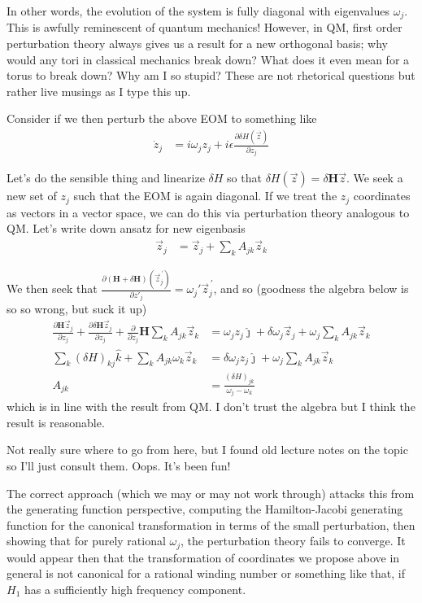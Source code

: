 \documentclass[12pt]{report}
\newcommand{\pd}[2]{\frac{\partial#1}{\partial#2}}
\newcommand{\pvec}[1]{\vec{#1}^{\,\prime}}
\begin{document}
In other words, the evolution of the system is fully diagonal with eigenvalues
$\omega_j$. This is awfully reminescent of quantum mechanics! However, in QM,
first order perturbation theory always gives us a result for a new orthogonal
basis; why would any tori in classical mechanics break down? What does it even
mean for a torus to break down? Why am I so stupid? These are not rhetorical
questions but rather live musings as I type this up.

Consider if we then perturb the above EOM to something like
\begin{align}
    \dot{z}_j &= i\omega_jz_j + i\epsilon \pd{\delta
    H\left(\vec{z}\right)}{z_j}
\end{align}

Let's do the sensible thing and linearize $\delta H$ so that
$\delta H(\vec{z}) = \delta \mathbf{H}\vec{z}$. We seek a new set of $z_j$
such that the EOM is again diagonal. If we treat the $z_j$ coordinates as
vectors in a vector space, we can do this via perturbation theory
analogous to QM\@. Let's write down ansatz for new eigenbasis
\begin{align}
    \vec{z}_j &= \vec{z}_j + \sum_kA_{jk}\vec{z}_k
\end{align}

We then seek that $\pd{(\mathbf{H} + \delta \mathbf{H})(\pvec{z}_j)}{z'_j} =
\omega_j' \pvec{z}_j$, and so (goodness the algebra below is so so wrong, but
suck it up)
\begin{align}
    \pd{\mathbf{H}\vec{z}_j}{z_j} + \pd{\delta \mathbf{H}\vec{z}_j}{z_j} +
        \pd{}{z_j}\mathbf{H}\sum_k A_{jk}\vec{z}_k
        &= \omega_j z_j\hat{\jmath} + \delta
        \omega_j \vec{z}_j + \omega_j \sum_k A_{jk}\vec{z}_k\\
    \sum_k (\delta H)_{kj}\hat{k} + \sum_kA_{jk}\omega_k \vec{z}_k &=
        \delta \omega_j z_j\hat{\jmath} + \omega_j \sum_k A_{jk}\vec{z}_k\\
    A_{jk} &= \frac{(\delta H)_{jk}}{\omega_j - \omega_k}
\end{align}
which is in line with the result from QM\@. I don't trust the algebra but I
think the result is reasonable.

Not really sure where to go from here, but I found old lecture notes on the
topic so I'll just consult them. Oops. It's been fun!

The correct approach (which we may or may not work through) attacks this from
the generating function perspective, computing the Hamilton-Jacobi generating
function for the canonical transformation in terms of the small perturbation,
then showing that for purely rational $\omega_j$, the perturbation theory fails
to converge. It would appear then that the transformation of coordinates we
propose above in general is not canonical for a rational winding number or
something like that, if $H_1$ has a sufficiently high frequency component.
\end{document}
